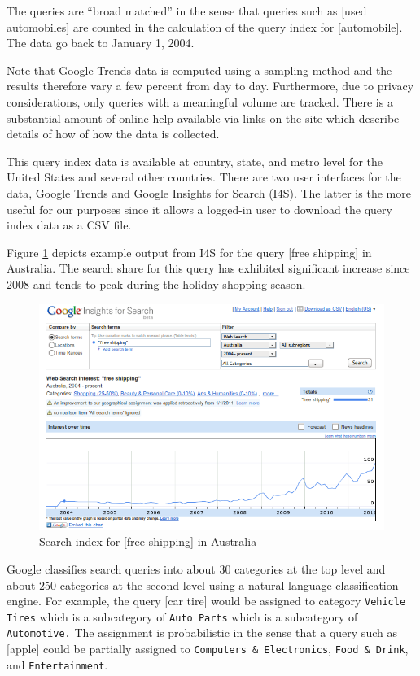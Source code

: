 \documentclass[12pt, oneside]{article}
\begin{document}
The queries are ``broad matched'' in the sense that queries such as
[used automobiles] are counted in the calculation of the query index
for [automobile].  The data go back to January 1, 2004.

Note that Google Trends data is computed using a sampling method and
the results therefore vary a few percent from day to day.
Furthermore, due to privacy considerations, only queries with a
meaningful volume are tracked.  There is a substantial amount of
online help available via links on the site which describe details of
how of how the data is collected.

This query index data is available at country, state, and metro level
for the United States and several other countries. There are two user
interfaces for the data, Google Trends and Google Insights for Search
(I4S).  The latter is the more useful for our purposes since it allows
a logged-in user to download the query index data as a CSV file.

Figure \ref{Fig:free-shipping} depicts example output from I4S for the
query [free shipping] in Australia. The search share for this query
has exhibited significant increase since 2008 and tends to peak during
the holiday shopping season.

\begin{figure}[ht]
\begin{center}
\includegraphics[width=5.2in]{free-shipping}
\caption{\label{Fig:free-shipping} Search index for [free shipping] in
Australia} 
\end{center}
\end{figure}

Google classifies search queries into about 30 categories at the top
level and about 250 categories at the second level using a natural
language classification engine.  For example, the query [car tire]
would be assigned to category {\tt Vehicle Tires} which is a
subcategory of {\tt Auto Parts} which is a subcategory of {\tt
  Automotive.}  The assignment is probabilistic in the sense that a
query such as [apple] could be partially assigned to {\tt Computers \&
  Electronics}, {\tt Food \& Drink}, and {\tt Entertainment}. 
\end{document}
